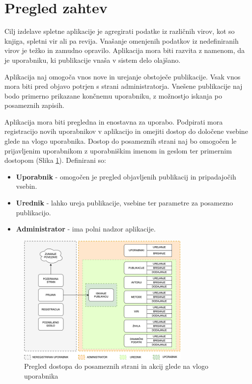 \documentclass[a4paper, 12pt]{book}
\begin{document}
\section{Pregled zahtev}
Cilj izdelave spletne aplikacije je agregirati podatke iz različnih virov, kot so knjiga, spletni vir ali pa revija. Vnašanje omenjenih podatkov iz nedefiniranih virov je težko in zamudno opravilo. Aplikacija mora biti razvita z namenom, da je uporabniku, ki publikacije vnaša v sistem delo olajšano. 

Aplikacija naj omogoča vnos nove in urejanje obstoječe publikacije. Vsak vnos mora biti pred objavo potrjen s strani administratorja. Vnešene publikacije naj bodo primerno prikazane končnemu uporabniku, z možnostjo iskanja po posameznih zapisih. 


Aplikacija mora biti pregledna in enostavna za uporabo. Podpirati mora registracijo novih uporabnikov v aplikacijo in omejiti dostop do določene vsebine glede na vlogo uporabnika. Dostop do posameznih strani naj bo omogočen le prijavljenim uporabnikom z uporabniškim imenom in geslom ter primernim dostopom (Slika \ref{user-rights}). 
Definirani so: 
\begin{itemize}
    \item \textbf{Uporabnik} - omogočen je pregled objavljenih publikacij in pripadajočih vsebin.
	\item \textbf{Urednik} - lahko ureja publikacije, vsebine ter parametre za posamezno publikacijo.
	\item \textbf{Administrator} - ima polni nadzor aplikacije.
\end{itemize}

\begin{figure}[h]
\begin{center}
\includegraphics[width=0.75\textwidth]{slike/user_hierarchy.png}
\end{center}
\caption{ Pregled dostopa do posameznih strani in akcij glede na vlogo uporabnika }
\label{user-rights}
\end{figure}
\end{document}
